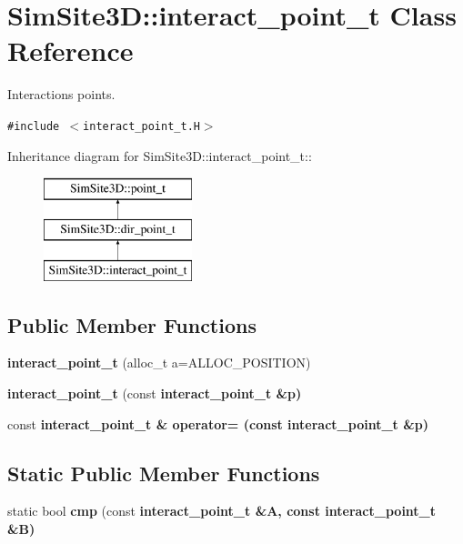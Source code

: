 \section{SimSite3D::interact\_\-point\_\-t Class Reference}
\label{classSimSite3D_1_1interact__point__t}
Interactions points.  


{\tt \#include $<$interact\_\-point\_\-t.H$>$}

Inheritance diagram for SimSite3D::interact\_\-point\_\-t::\begin{figure}[H]
\begin{center}
\leavevmode
\includegraphics[height=3cm]{classSimSite3D_1_1interact__point__t}
\end{center}
\end{figure}
\subsection*{Public Member Functions}
\begin{CompactItemize}
\item 
\textbf{interact\_\-point\_\-t} (alloc\_\-t a=ALLOC\_\-POSITION)\label{classSimSite3D_1_1interact__point__t_847336b4146fb570f5dbf56a0cd1d2dc}

\item 
\textbf{interact\_\-point\_\-t} (const \bf{interact\_\-point\_\-t} \&p)\label{classSimSite3D_1_1interact__point__t_2d6a71e803d863c51a4fbd9d141c563c}

\item 
const \bf{interact\_\-point\_\-t} \& \textbf{operator=} (const \bf{interact\_\-point\_\-t} \&p)\label{classSimSite3D_1_1interact__point__t_b4f20ff04e85bf54b0ef6652ff899c04}

\end{CompactItemize}
\subsection*{Static Public Member Functions}
\begin{CompactItemize}
\item 
static bool \textbf{cmp} (const \bf{interact\_\-point\_\-t} \&A, const \bf{interact\_\-point\_\-t} \&B)\label{classSimSite3D_1_1interact__point__t_422857df1c11412c9c2b750f9d2d3ee2}

\end{CompactItemize}
